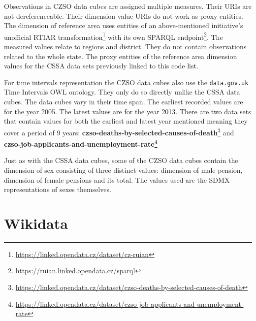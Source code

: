 Observations in CZSO data cubes are assigned multiple measures. Their URIs are not dereferenceable. Their dimension value URIs do not work as proxy entities. The dimension of reference area uses entities of an above-mentioned initiative's unofficial RTIAR transformation\footnote{\href{https://linked.opendata.cz/dataset/cz-ruian}{https://linked.opendata.cz/dataset/cz-ruian}} with its own SPARQL endpoint\footnote{\href{https://ruian.linked.opendata.cz/sparql}{https://ruian.linked.opendata.cz/sparql}}. The measured values relate to regions and district. They do not contain observations related to the whole state. The proxy entities of the reference area dimension values for the CSSA data sets previously linked to this code list. 

For time intervals representation the CZSO data cubes also use the \verb|data.gov.uk| Time Intervals OWL ontology. They only do so directly unlike the CSSA data cubes. The data cubes vary in their time span. The earliest recorded values are for the year 2005. The latest values are for the year 2013. There are two data sets that contain values for both the earliest and latest year mentioned meaning they cover a period of 9 years: \textbf{czso-deaths-by-selected-causes-of-death}\footnote{\href{https://linked.opendata.cz/dataset/czso-deaths-by-selected-causes-of-death}{https://linked.opendata.cz/dataset/czso-deaths-by-selected-causes-of-death}} and \textbf{czso-job-applicants-and-unemployment-rate}\footnote{\href{https://linked.opendata.cz/dataset/czso-job-applicants-and-unemployment-rate}{https://linked.opendata.cz/dataset/czso-job-applicants-and-unemployment-rate}}

Just as with the CSSA data cubes, some of the CZSO data cubes contain the dimension of sex consisting of three distinct values: dimension of male pension, dimension of female pensions and its total. The values used are the SDMX representations of sexes themselves.

\section{Wikidata}

